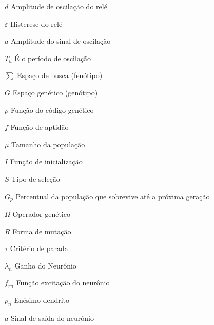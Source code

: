 \begin{simbolos}
  \item[$d$] Amplitude de oscilação do relé
  \item[$\varepsilon$] Histerese do relé
  \item[$a$] Amplitude do sinal de oscilação
  \item[$T_u$] É o período de oscilação
  \item[$\sum$] Espaço de busca (fenótipo)
  \item[$G$] Espaço genético (genótipo)
  \item[$\rho$] Função do código genético
  \item[$f$] Função de aptidão
  \item[$\mu$] Tamanho da população
  \item[$I$] Função de inicialização
  \item[$S$] Tipo de seleção
  \item[$G_p$] Percentual da população que sobrevive até a próxima geração
  \item[$\Omega$] Operador genético
  \item[$R$] Forma de mutação
  \item[$\tau$] Critério de parada
  \item[$\lambda_n$] Ganho do Neurônio
  \item[$f_{rn}$] Função excitação do neurônio
  \item[$p_n$] Enésimo dendrito
  \item[$a$] Sinal de saída do neurônio
\end{simbolos}